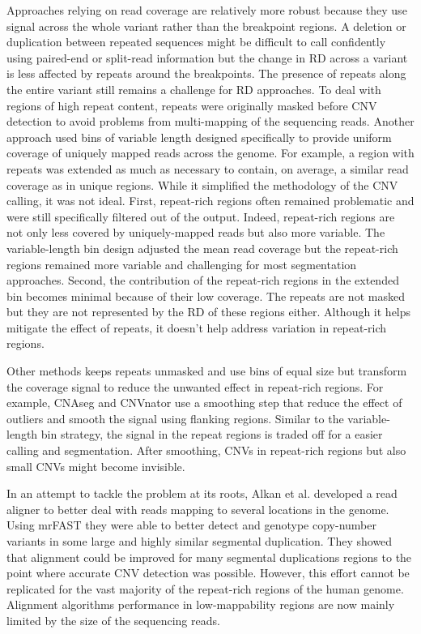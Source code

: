 Approaches relying on read coverage are relatively more robust because they use signal across the whole variant rather than the breakpoint regions.
A deletion or duplication between repeated sequences might be difficult to call confidently using paired-end or split-read information but the change in RD across a variant is less affected by repeats around the breakpoints.
The presence of repeats along the entire variant still remains a challenge for RD approaches.
To deal with regions of high repeat content, repeats were originally masked before CNV detection to avoid problems from multi-mapping of the sequencing reads\cite{Alkan2009,Sudmant2010a}.
Another approach used bins of variable length designed specifically to provide uniform coverage of uniquely mapped reads across the genome\cite{cam2008ide}.
For example, a region with repeats was extended as much as necessary to contain, on average, a similar read coverage as in unique regions.
While it simplified the methodology of the CNV calling, it was not ideal.
First, repeat-rich regions often remained problematic and were still specifically filtered out of the output.
Indeed, repeat-rich regions are not only less covered by uniquely-mapped reads but also more variable.
The variable-length bin design adjusted the mean read coverage but the repeat-rich regions remained more variable and challenging for most segmentation approaches.
Second, the contribution of the repeat-rich regions in the extended bin becomes minimal because of their low coverage.
The repeats are not masked but they are not represented by the RD of these regions either.
Although it helps mitigate the effect of repeats, it doesn't help address variation in repeat-rich regions.

Other methods keeps repeats unmasked and use bins of equal size but transform the coverage signal to reduce the unwanted effect in repeat-rich regions.
For example, {\sf CNAseg}\cite{Ivakhno2010} and {\sf CNVnator}\cite{Abyzov2011} use a smoothing step that reduce the effect of outliers and smooth the signal using flanking regions.
Similar to the variable-length bin strategy, the signal in the repeat regions is traded off for a easier calling and segmentation.
After smoothing, CNVs in repeat-rich regions but also small CNVs might become invisible.

In an attempt to tackle the problem at its roots, Alkan et al. developed a read aligner to better deal with reads mapping to several locations in the genome\cite{Alkan2009}.
Using {\sf mrFAST} they were able to better detect and genotype copy-number variants in some large and highly similar segmental duplication.
They showed that alignment could be improved for many segmental duplications regions to the point where accurate CNV detection was possible.
However, this effort cannot be replicated for the vast majority of the repeat-rich regions of the human genome.
Alignment algorithms performance in low-mappability regions are now mainly limited by the size of the sequencing reads.



